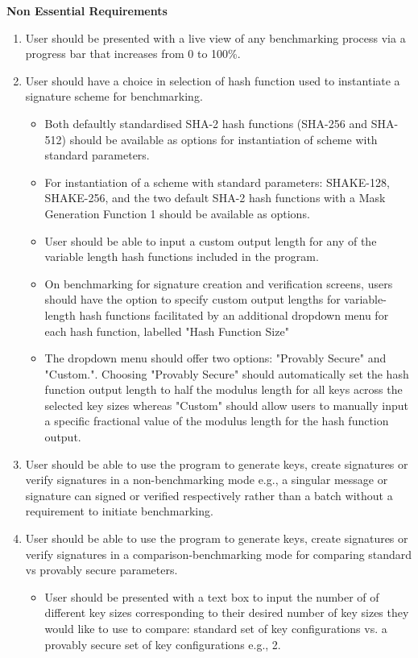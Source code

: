 \documentclass[]{final_report}
\theoremstyle{definition}
\begin{document}
\textbf{Non Essential Requirements}
\begin{enumerate}
\item User should be presented with a live view of any benchmarking process via a progress bar that increases from 0 to 100\%.
\item User should have a choice in selection of hash function used to instantiate a signature scheme for benchmarking.
\begin{itemize}
\item Both defaultly standardised SHA-2 hash functions (SHA-256 and SHA-512) should be available as options for instantiation of scheme with standard parameters.
\item For instantiation of a scheme with standard parameters: SHAKE-128, SHAKE-256, and the two default SHA-2 hash functions with a Mask Generation Function 1 should be available as options.
\item User should be able to input a custom output length for any of the variable length hash functions included in the program.
\item On benchmarking for signature creation and verification screens, users should have the option to specify custom output lengths for variable-length hash functions facilitated by an additional dropdown menu for each hash function, labelled "Hash Function Size"
\item The dropdown menu should offer two options: "Provably Secure" and "Custom.". Choosing "Provably Secure"  should automatically set the hash function output length to half the modulus length for all keys across the selected key sizes whereas "Custom" should allow users to manually input a specific fractional value of the modulus length for the hash function output.
\end{itemize}
\item User should be able to use the program to generate keys, create signatures or verify signatures in a non-benchmarking mode e.g., a singular message or signature can signed or verified respectively rather than a batch without a requirement to initiate benchmarking.
\item User should be able to use the program to generate keys, create signatures or verify signatures in a comparison-benchmarking mode for comparing standard vs provably secure parameters.
\begin{itemize}
\item User should be presented with a text box to input the number of of different key sizes corresponding to their desired number of key sizes they would like to use to compare: standard set of key configurations vs. a provably secure set of key configurations e.g., 2.

\end{itemize}
\end{enumerate}
\end{document}
